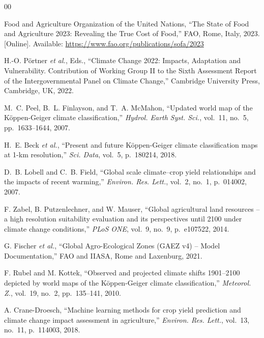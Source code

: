 \documentclass{ieeeaccess}
\begin{document}
\appendices
\begin{thebibliography}{00}


Food and Agriculture Organization of the United Nations, ``The State of Food and Agriculture 2023: Revealing the True Cost of Food,'' FAO, Rome, Italy, 2023. [Online]. Available: \url{https://www.fao.org/publications/sofa/2023}

H.-O. P\"{o}rtner \textit{et al.}, Eds., ``Climate Change 2022: Impacts, Adaptation and Vulnerability. Contribution of Working Group II to the Sixth Assessment Report of the Intergovernmental Panel on Climate Change,'' Cambridge University Press, Cambridge, UK, 2022.

M.~C. Peel, B.~L. Finlayson, and T.~A. McMahon, ``Updated world map of the K\"{o}ppen-Geiger climate classification,'' \textit{Hydrol. Earth Syst. Sci.}, vol.~11, no.~5, pp.~1633--1644, 2007.

H.~E. Beck \textit{et al.}, ``Present and future K\"{o}ppen-Geiger climate classification maps at 1-km resolution,'' \textit{Sci. Data}, vol.~5, p.~180214, 2018.

D.~B. Lobell and C.~B. Field, ``Global scale climate--crop yield relationships and the impacts of recent warming,'' \textit{Environ. Res. Lett.}, vol.~2, no.~1, p.~014002, 2007.

F. Zabel, B. Putzenlechner, and W. Mauser, ``Global agricultural land resources -- a high resolution suitability evaluation and its perspectives until 2100 under climate change conditions,'' \textit{PLoS ONE}, vol.~9, no.~9, p.~e107522, 2014.

G. Fischer \textit{et al.}, ``Global Agro-Ecological Zones (GAEZ v4) -- Model Documentation,'' FAO and IIASA, Rome and Laxenburg, 2021.

F. Rubel and M. Kottek, ``Observed and projected climate shifts 1901--2100 depicted by world maps of the K\"{o}ppen-Geiger climate classification,'' \textit{Meteorol. Z.}, vol.~19, no.~2, pp.~135--141, 2010.

A. Crane-Droesch, ``Machine learning methods for crop yield prediction and climate change impact assessment in agriculture,'' \textit{Environ. Res. Lett.}, vol.~13, no.~11, p.~114003, 2018.


\end{thebibliography}
\end{document}
